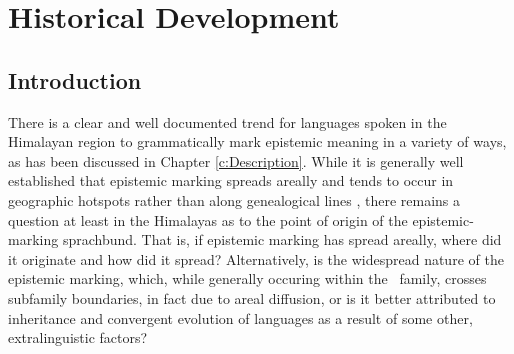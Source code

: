 \chapter{Historical Development}\label{c:History}
\section{Introduction}
There is a clear and well documented trend for languages spoken in the Himalayan region to grammatically mark epistemic meaning in a variety of ways, as has been discussed in Chapter \ref{c:Description}. While it is generally well established that epistemic marking spreads areally and tends to occur in geographic hotspots rather than along genealogical lines \cites[288]{Aikhenvald2004}{SanRoque2012}{Verhees2018}, there remains a question at least in the Himalayas as to the point of origin of the epistemic-marking sprachbund. That is, if epistemic marking has spread areally, where did it originate and how did it spread? Alternatively, is the widespread nature of the epistemic marking, which, while generally occuring within the \lfam\ family, crosses subfamily boundaries, in fact due to areal diffusion, or is it better attributed to inheritance and convergent evolution of languages as a result of some other, extralinguistic factors?

